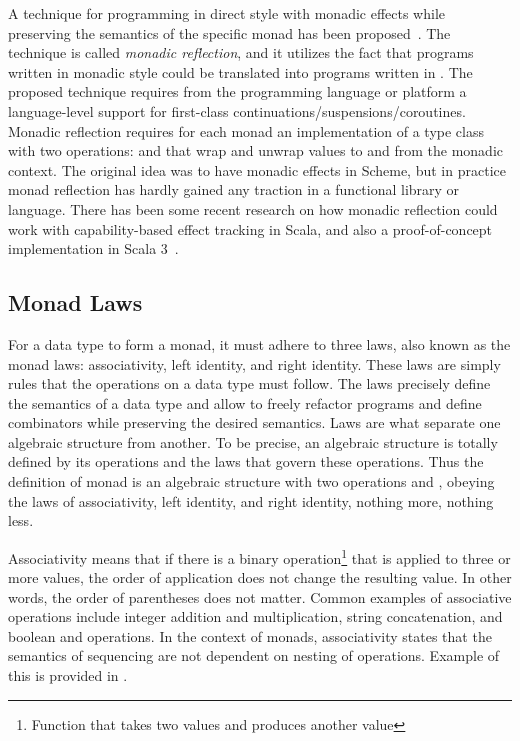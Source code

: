 A technique for programming in direct style with monadic effects while preserving the semantics of the specific monad has been proposed~\cite{representing-monads}. The technique is called \textit{monadic reflection}, and it utilizes the fact that programs written in monadic style could be translated into programs written in . The proposed technique requires from the programming language or platform a language-level support for first-class continuations/suspensions/coroutines. Monadic reflection requires for each monad an implementation of a type class with two operations:  and  that wrap and unwrap values to and from the monadic context. The original idea was to have monadic effects in Scheme, but in practice monad reflection has hardly gained any traction in a functional library or language. There has been some recent research on how monadic reflection could work with capability-based effect tracking in Scala, and also a proof-of-concept implementation in Scala 3~\cite{representing-monads-capabilities, monadic-reflection-scala}.


\subsection{Monad Laws} \label{monad:laws}
For a data type to form a monad, it must adhere to three laws, also known as the monad laws: associativity, left identity, and right identity. These laws are simply rules that the operations on a data type must follow. The laws precisely define the semantics of a data type and allow to freely refactor programs and define combinators while preserving the desired semantics. Laws are what separate one algebraic structure from another. To be precise, an algebraic structure is totally defined by its operations and the laws that govern these operations. Thus the definition of monad is an algebraic structure with two operations
 and , obeying the laws of associativity, left identity, and right identity, nothing more, nothing less.~\cite{fp-in-scala}



Associativity means that if there is a binary operation\footnote{Function that takes two values and produces another value} that is applied to three or more values, the order of application does not change the resulting value. In other words, the order of parentheses does not matter. Common examples of associative operations include integer addition and multiplication, string concatenation, and boolean \inlinecode{&&} and \inlinecode{||} operations. In the context of monads, associativity states that the semantics of sequencing are not dependent on nesting of  operations. Example of this is provided in .

